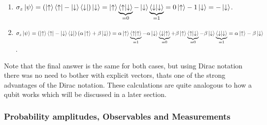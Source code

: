 \begin{enumerate}[label=\textbf{\alph*)}]
\item  $\sigma_z \ket{\psi} = (\ket{\uparrow}\bra{\uparrow} - \ket{\downarrow}\bra{\downarrow})\ket{\downarrow} = \ket{\uparrow}\underbrace{\bra{\uparrow}\ket{\downarrow}}_{ = 0} - \ket{\downarrow}\underbrace{\bra{\downarrow}\ket{\downarrow}}_{ = 1} = 0\ket{\uparrow} - 1\ket{\downarrow} = -\ket{\downarrow}$.
\item $\sigma_z \ket{\psi} = \left( \ket{\uparrow}\bra{\uparrow} - \ket{\downarrow}\bra{\downarrow} \right) \left(\alpha\ket{\uparrow} + \beta\ket{\downarrow} \right) = 
\alpha\ket{\uparrow}\underbrace{\bra{\uparrow}\ket{\uparrow}}_{ = 1} - \alpha\ket{\downarrow}\underbrace{\bra{\downarrow}\ket{\uparrow}}_{ = 0}
+
\beta\ket{\uparrow}\underbrace{\bra{\uparrow}\ket{\downarrow}}_{ = 0} - \beta\ket{\downarrow}\underbrace{\bra{\downarrow}\ket{\downarrow}}_{ = 1} = \alpha\ket{\uparrow} - \beta\ket{\downarrow}$.
\end{enumerate}
Note that the final answer is the same for both cases, but using Dirac notation there was no need to bother with explicit vectors, thats one of the strong advantages of the Dirac notation. These calculations are quite analogous to how a qubit works which will be discussed in a later section. 


\subsubsection{Probability amplitudes, Observables and Measurements}



